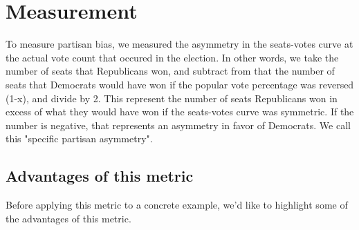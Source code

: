 \documentclass[preprint,12pt]{article}
\begin{document}
\section{Measurement}
To measure partisan bias, we measured the asymmetry in the seats-votes curve at the actual vote count that occured in the election.  
In other words, we take the number of seats that Republicans won, and subtract from that the number of seats that Democrats would have won if the popular vote percentage was reversed (1-x), and divide by 2.  
This represent the number of seats Republicans won in excess of what they would have won if the seats-votes curve was symmetric.  
If the number is negative, that represents an asymmetry in favor of Democrats.
We call this "specific partisan asymmetry".

\subsection{Advantages of this metric}
 
Before applying this metric to a concrete example, we'd like to highlight some of the advantages of this metric.
\end{document}
